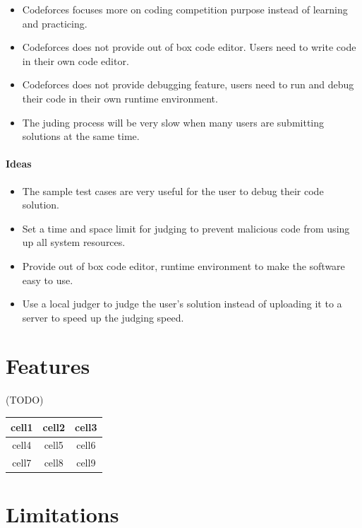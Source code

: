\documentclass{report}
\begin{document}
\begin{itemize}
    \item Codeforces focuses more on coding competition purpose instead of learning and practicing.
    \item Codeforces does not provide out of box code editor. Users need to write code in their own code editor.
    \item Codeforces does not provide debugging feature, users need to run and debug their code in their own runtime environment.
    \item The juding process will be very slow when many users are submitting solutions at the same time.
\end{itemize}

\paragraph{Ideas}

\begin{itemize}
    \item The sample test cases are very useful for the user to debug their code solution.
    \item Set a time and space limit for judging to prevent malicious code from using up all system resources.
    \item Provide out of box code editor, runtime environment to make the software easy to use.
    \item Use a local judger to judge the user's solution instead of uploading it to a server to speed up the judging speed. 
\end{itemize}

\section{Features}

(TODO)

\begin{center}
\begin{tabular}{ |c|c|c| } 
 \hline
 cell1 & cell2 & cell3 \\ 
  \hline
 cell4 & cell5 & cell6 \\ 
  \hline
 cell7 & cell8 & cell9 \\ 
 \hline
\end{tabular}
\end{center}

\section{Limitations}
\end{document}
